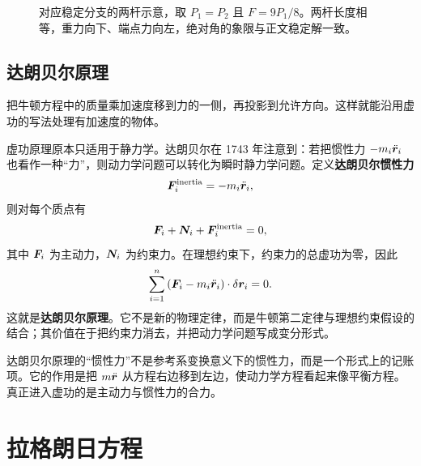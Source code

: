 \begin{figure}[htbp]
\centering
{}
\caption{对应稳定分支的两杆示意，取 $P_1=P_2$ 且 $F=9P_1/8$。两杆长度相等，重力向下、端点力向左，绝对角的象限与正文稳定解一致。}
\label{fig:two-rods}
\end{figure}

\subsection{达朗贝尔原理}

把牛顿方程中的质量乘加速度移到力的一侧，再投影到允许方向。这样就能沿用虚功的写法处理有加速度的物体。

虚功原理原本只适用于静力学。达朗贝尔在 1743 年注意到：若把惯性力 $-m_i\ddot{\boldsymbol{r}}_i$ 也看作一种“力”，则动力学问题可以转化为瞬时静力学问题。定义\textbf{达朗贝尔惯性力}
\[
\boldsymbol{F}_i^{\rm inertia}=-m_i\ddot{\boldsymbol{r}}_i,
\]
则对每个质点有
\[
\boldsymbol{F}_i+\boldsymbol{N}_i+\boldsymbol{F}_i^{\rm inertia}=0,
\]
其中 $\boldsymbol{F}_i$ 为主动力，$\boldsymbol{N}_i$ 为约束力。在理想约束下，约束力的总虚功为零，因此
\begin{equation}
\sum_{i=1}^{n}\left(\boldsymbol{F}_i-m_i\ddot{\boldsymbol{r}}_i\right)\cdot\delta\boldsymbol{r}_i=0.
\label{eq:dAlembert}
\end{equation}
这就是\textbf{达朗贝尔原理}。它不是新的物理定律，而是牛顿第二定律与理想约束假设的结合；其价值在于把约束力消去，并把动力学问题写成变分形式。

\begin{physicsbox}
达朗贝尔原理的“惯性力”不是参考系变换意义下的惯性力，而是一个形式上的记账项。它的作用是把 $m\ddot{\boldsymbol{r}}$ 从方程右边移到左边，使动力学方程看起来像平衡方程。真正进入虚功的是主动力与惯性力的合力。
\end{physicsbox}

\section{拉格朗日方程}


